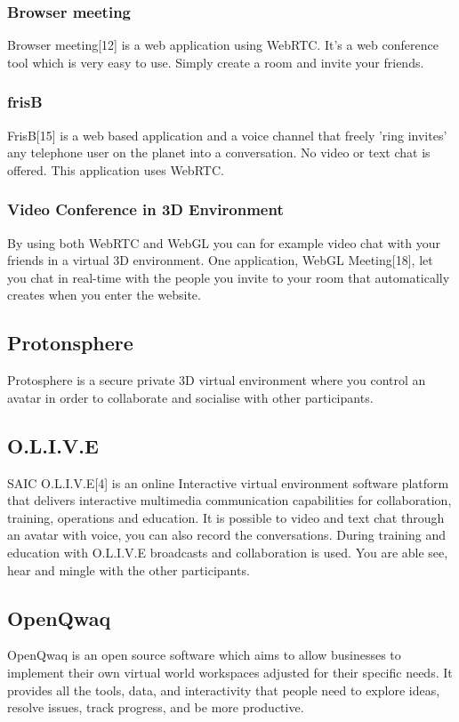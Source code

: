 \documentclass[12pt, titlepage]{article}
\begin{document}
\subsubsection{Browser meeting}
Browser meeting[12] is a web application using WebRTC. It’s a web conference tool which is very easy to use. Simply create a room and invite your friends.
\subsubsection{frisB}
FrisB[15] is a web based application and a voice channel that freely 'ring invites' any telephone user on the planet into a conversation. No video or text chat is offered. This application uses WebRTC.
\subsubsection{Video Conference in 3D Environment}
By using both WebRTC and WebGL you can for example video chat with your friends in a virtual 3D environment. One application, WebGL Meeting[18], let you chat in real-time with the people you invite to your room that automatically creates when you enter the website.
\subsection{Protonsphere}
Protosphere is a secure private 3D virtual environment where you control an avatar in order to collaborate and socialise with other participants.
\subsection{O.L.I.V.E}
SAIC O.L.I.V.E[4] is an online Interactive virtual environment software platform that delivers interactive multimedia communication capabilities for collaboration, training, operations and education. It is possible to video and text chat through an avatar with voice, you can also record the conversations. During training and education with O.L.I.V.E broadcasts and collaboration is used. You are able see, hear and mingle with the other participants.
\subsection{OpenQwaq}
OpenQwaq is an open source software which aims to allow businesses to implement their own virtual world workspaces adjusted for their specific needs. It provides all the tools, data, and interactivity that people need to explore ideas, resolve issues, track progress, and be more productive.
\end{document}
